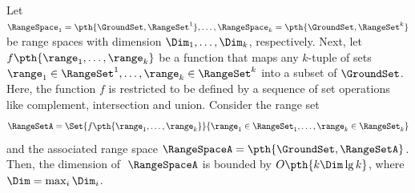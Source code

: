 \begin {theorem} Let $\RangeSpace _1 = \pth {\GroundSet ,\RangeSet ^1}, \ldots , \RangeSpace _k = \pth {\GroundSet ,\RangeSet ^k}$ be range spaces with \VC dimension $\Dim _1, \ldots , \Dim _k$, respectively. Next, let $f\pth { \range _1, \ldots , \range _k}$ be a function that maps any $k$-tuple of sets $\range _1 \in \RangeSet ^1, \ldots , \range _k \in \RangeSet ^k$ into a subset of $\GroundSet $. Here, the function $f$ is restricted to be defined by a sequence of set operations like complement, intersection and union. Consider the range set \begin {align*} \RangeSetA =\Set { f\pth { \range _1, \ldots , \range _k}}{ \range _1 \in \RangeSet _1, \ldots , \range _k \in \RangeSet _k \bigr .} \end {align*} and the associated range space $\RangeSpaceA = \pth {\GroundSet , \RangeSetA }$. Then, the \VC dimension of $\;\RangeSpaceA $ is bounded by $O\pth { k \Dim \lg k}$, where $\Dim = \max _i \Dim _i$. \par {} \end {theorem}
